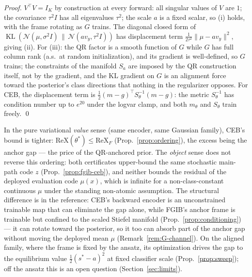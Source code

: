 \begin{proof}
$V^{\top}V = I_K$ by construction at every forward: all singular values of $V$ are $1$;
the covariance $\tau^2 I$ has all eigenvalues $\tau^2$; the scale $a$ is a fixed
scalar, so (i) holds, with the frame rotating as $G$ trains. The diagonal closed
form of
$\operatorname{KL}(\mathcal{N}(\mu, \sigma^2 I)\,\|\,\mathcal{N}(a v_y, \tau^2 I))$
has displacement term $\tfrac{1}{2\tau^2}\|\mu - a v_y\|^2$, giving (ii). For (iii):
the QR factor is a smooth function of $G$ while $G$ has full column rank (a.s.\ at
random initialization), and its gradient is well-defined, so $G$ trains; the constraints
of the manifold $S_a$ are imposed by the QR construction itself, not by the gradient,
and the KL gradient on $G$ is an alignment force toward the posterior's class directions
that nothing in the regularizer opposes. For CEB, the displacement term is
$\tfrac12(m - g)^{\top} S_\theta^{-1}(m - g)$: the metric $S_\theta^{-1}$ has condition
number up to $e^{20}$ under the logvar clamp, and both $m_\theta$ and $S_\theta$ train
freely. \hfill\qed
\end{proof}

\begin{remark}\label{rem:senses}
In the pure variational \emph{value} sense (same encoder, same Gaussian family), CEB's
bound is tighter: $\mathrm{ReX}(\theta^*) \le \mathrm{ReX}_F$
(Prop.~\ref{prop:ordering}), the excess being the anchor gap --- the price of the
QR-anchored prior. The \emph{object} sense does not reverse this ordering: both
certificates upper-bound the same stochastic main-path code $z$
(Prop.~\ref{prop:fgib-ceb}), and neither bounds the residual of the deployed evaluation
code $\mu(x)$, which is infinite for a non-class-constant continuous $\mu$ under the
standing non-atomic assumption. The structural difference is in the reference: CEB's
backward encoder is an unconstrained trainable map that can eliminate the gap alone,
while FGIB's anchor frame is trainable but confined to the scaled Stiefel manifold
(Prop.~\ref{prop:conditioning}) --- it can rotate toward the posterior, so it too can
absorb part of the anchor gap without moving the deployed mean $\mu$
(Remark~\ref{rem:G-channel}). On the aligned family, where the frame is fixed by the
ansatz, its optimization drives the gap to the equilibrium value
$\tfrac12(s^*-a)^2$ at fixed classifier scale (Prop.~\ref{prop:sweep}); off the ansatz
this is an open question (Section~\ref{sec:limits}).
\end{remark}

